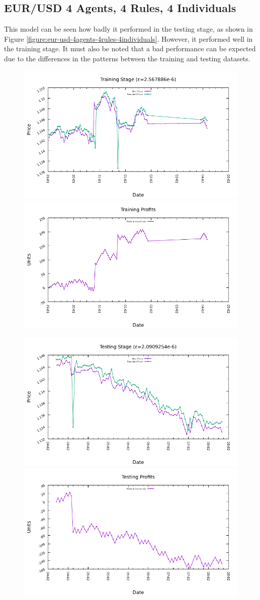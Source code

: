 \newpage

\subsection{EUR/USD 4 Agents, 4 Rules, 4 Individuals}
\label{results:forecast-eur-usd-4agents-4rules-4individuals}

This model can be seen how badly it performed in the testing stage, as shown in
Figure \ref{figure:eur-usd-4agents-4rules-4individuals}. However, it performed
well in the training stage. It must also be noted that a bad performance can be
expected due to the differences in the patterns between the training and testing
datasets.

\begin{figure}[htp]
  \centering

  \includegraphics[width=.45\textwidth]{img/plots/eur_usd_h1-4agents-4rules-4ind-100gen_training_fit.pdf}\quad
  \includegraphics[width=.45\textwidth]{img/plots/eur_usd_h1-4agents-4rules-4ind-100gen_training_profits.pdf}

  \medskip

  \includegraphics[width=.45\textwidth]{img/plots/eur_usd_h1-4agents-4rules-4ind-100gen_testing_fit.pdf}\quad
  \includegraphics[width=.45\textwidth]{img/plots/eur_usd_h1-4agents-4rules-4ind-100gen_testing_profits.pdf}


\end{figure}
